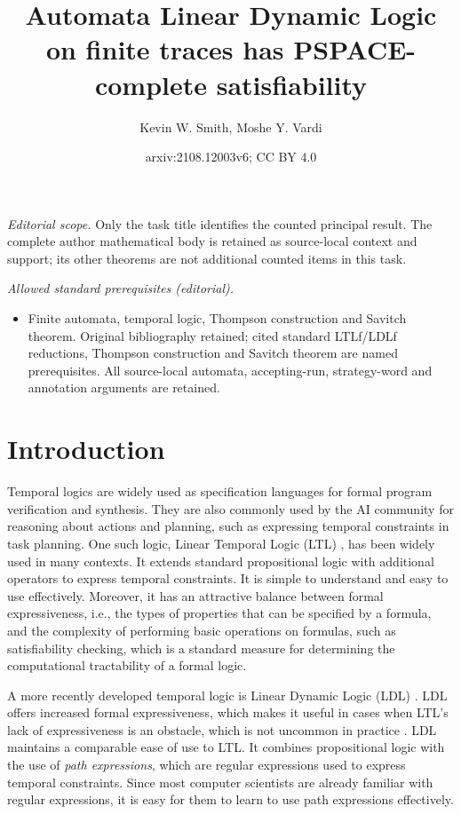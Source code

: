 \documentclass[10pt,a4paper]{amsart}
\title{Automata Linear Dynamic Logic on finite traces has PSPACE-complete satisfiability}
\author{Kevin W. Smith, Moshe Y. Vardi}
\date{arxiv:2108.12003v6; CC BY 4.0}
\theoremstyle{plain}
\theoremstyle{definition}
\theoremstyle{definition}
\DeclareMathOperator{\?}{?}
\begin{document}
\maketitle
\noindent\textit{Editorial scope.} Only the task title identifies the counted principal result. The complete author mathematical body is retained as source-local context and support; its other theorems are not additional counted items in this task.\par\medskip
\noindent\textit{Allowed standard prerequisites (editorial).}\begin{itemize}
\item Finite automata, temporal logic, Thompson construction and Savitch theorem. Original bibliography retained; cited standard LTLf/LDLf reductions, Thompson construction and Savitch theorem are named prerequisites. All source-local automata, accepting-run, strategy-word and annotation arguments are retained.
\end{itemize}\medskip
\section{Introduction}
\label{ch:introduction}

Temporal logics are widely used as specification languages for formal program verification and synthesis. They are also commonly used by the AI community for reasoning about actions and planning, such as expressing temporal constraints in task planning. One such logic, Linear Temporal Logic (LTL) \cite{pnueli77}, has been widely used in many contexts. It extends standard propositional logic with additional operators to express temporal constraints. It is simple to understand and easy to use effectively. Moreover, it has an attractive balance between formal expressiveness, i.e., the types of properties that can be specified by a formula, and the complexity of performing basic operations on formulas, such as satisfiability checking, which is a standard measure for determining the computational tractability of a formal logic.

A more recently developed temporal logic is Linear Dynamic Logic (LDL) \cite{ldlf}. LDL offers increased formal expressiveness, which makes it useful in cases when LTL's lack of expressiveness is an obstacle, which is not uncommon in practice \cite{ldlf}. LDL maintains a comparable ease of use to LTL. It combines propositional logic with the use of \textit{path expressions}, which are regular expressions used to express temporal constraints. Since most computer scientists are already familiar with regular expressions, it is easy for them to learn to use path expressions effectively.
\end{document}
